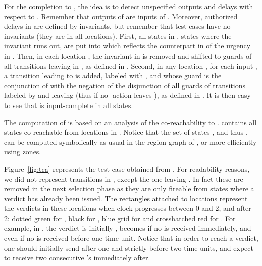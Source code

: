 \documentclass{LMCS}
\theoremstyle{plain}\newtheorem{proposition}[thm]{Proposition}
\begin{document}
For the
completion to , the idea is to detect unspecified outputs and delays 
with respect to .  
Remember that outputs of  are inputs of . 
Moreover, authorized delays in  are defined by invariants, 
but remember that test cases have no invariants (they are  in all locations).
First, all states in , \ie
states where the invariant runs out, are put into 
which reflects the counterpart in  of the urgency in . 
Then, in each location , the invariant  in  is
removed and shifted to guards of all transitions leaving  in
, as defined in .
Second, in any location , for each input , a transition
leading to  is added, labeled with , and whose guard is
the conjunction of  
with the negation of the disjunction of all guards of transitions labeled
by  and leaving  (thus  if no -action leaves
), as defined in .  
It is then easy to see that  is input-complete in all states.

 




The computation of  is based on an analysis of the
co-reachability to .  
 contains all states co-reachable from locations in .  
Notice that the set of states , and thus ,
can be computed symbolically as usual in the region graph
of , or more efficiently using zones.

\begin{exa}
  Figure~\ref{fig:tca} represents the test case  obtained from
  .  For readability reasons, we did not represent transitions in
  , except the one leaving .  In fact these are
  removed in the next selection phase as they are only fireable from
  states where a verdict has already been issued.  The rectangles
  attached to locations represent the verdicts in these locations when
  clock  progresses between 0 and 2, and after 2: dotted green for
  , black for , blue grid for  and
  crosshatched red for .  For example, in , the
  verdict is initially , becomes  if no  is
  received immediately, and even  if no  is received before
  one time unit.  Notice that in order to reach a  verdict, one
  should initially send  after one and strictly before two time
  units, and expect to receive two consecutive 's immediately
  after.
\end{exa}
\end{document}

